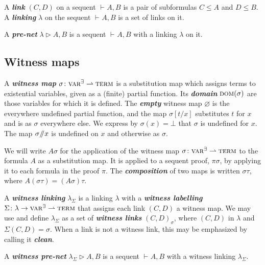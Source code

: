 \documentclass[UKenglish]{lipics-v2016}
\theoremstyle{plain}
\newcommand\defn[1]{\textit{\textbf{#1}}}
\newcommand\varA{\textsc{var}^\forall}
\newcommand\varE{\textsc{var}^\exists}
\newcommand\terms{\textsc{term}}
\newcommand\dom[1]{\textsc{dom}(#1)}
\newcommand\+{+}
\renewcommand\*{\times}
\newcommand\seq[3][]{{\vdash_{#1}}#2,#3}
\newcommand\net[3]{#1\triangleright #2,#3}
\newcommand\link[3][\sigma]{(#2,#3)_{#1}}
\newcommand\minus{\mathop{\!/\mathchoice{\kern-3pt}{\kern-3pt}{\kern-2.5pt}{\kern-2pt}/\!}}
\begin{document}
A \defn{link} $(C,D)$ on a sequent $\seq AB$ is a pair of subformulas $C\leq A$ and $D\leq B$. 
A \defn{linking} $\lambda$ on the sequent $\seq AB$ is a set of links on it.

\begin{definition}
A \defn{pre-net} $\net\lambda AB$ is a sequent $\seq AB$ with a linking $\lambda$ on it.
\end{definition}



\subsection{Witness maps}

A \defn{witness map} $\sigma\colon \varE \rightharpoonup \terms$ is a substitution map which assigns terms to existential variables, given as a (finite) partial function. Its \defn{domain} $\dom\sigma$ are those variables for which it is defined. The \defn{empty} witness map $\varnothing$ is the everywhere undefined partial function, and the map $\sigma[t/x]$ substitutes $t$ for $x$ and is as $\sigma$ everywhere else. We express by $\sigma(x)=\bot$ that $\sigma$ is undefined for $x$. The map $\sigma\minus x$ is undefined on $x$ and otherwise as $\sigma$. 

We will write $A\sigma$ for the application of the witness map $\sigma\colon\varE\rightharpoonup\terms$ to the formula $A$ as a substitution map. It is applied to a sequent proof, $\pi\sigma$, by applying it to each formula in the proof $\pi$. The \defn{composition} of two maps is written $\sigma\tau$, where $A(\sigma\tau)=(A\sigma)\tau$.

A \defn{witness linking} $\lambda_\Sigma$ is a linking $\lambda$ with a \defn{witness labelling} $\Sigma\colon\lambda\to \varE\rightharpoonup\terms$ that assigns each link $(C,D)$ a witness map. We may use and define $\lambda_\Sigma$ as a set of \defn{witness links} $\link CD$, where $(C,D)$ in $\lambda$ and $\Sigma(C,D)=\sigma$. When a link is not a witness link, this may be emphasized by calling it \defn{clean}.

\begin{definition}
A \defn{witness pre-net} $\net{\lambda_\Sigma}AB$ is a sequent $\seq AB$ with a witness linking $\lambda_\Sigma$.
%
%
%
\end{definition}
\end{document}
